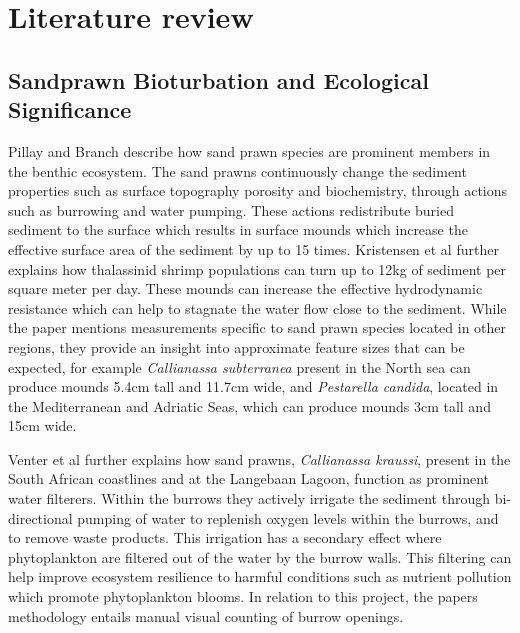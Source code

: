 %
\chapter{Literature review}
\label{ch:review}

 \section{Sandprawn Bioturbation and Ecological Significance}
 Pillay and Branch \cite{inbook} describe how sand prawn species are prominent members in the benthic ecosystem. The sand prawns continuously change the sediment properties such as surface topography porosity and biochemistry, through actions such as burrowing and water pumping. These actions redistribute buried sediment to the surface which results in surface mounds which increase the effective surface area of the sediment by up to 15 times. Kristensen et al \cite{kristensenWhatBioturbationNeed2012} further explains how thalassinid shrimp populations can turn up to 12kg of sediment per square meter per day.  These mounds can increase the effective hydrodynamic resistance which can help to stagnate the water flow close to the sediment. While the paper mentions measurements specific to sand prawn species located in other regions, they provide an insight into approximate feature sizes that can be expected, for example \textit{Callianassa subterranea} present in the North sea can produce mounds 5.4cm tall and 11.7cm wide, and \textit{Pestarella candida}, located in the Mediterranean and Adriatic Seas, which can produce mounds 3cm tall and 15cm wide.
 
 
 Venter et al \cite{venterWaterFiltrationBurrowing2020} further explains how sand prawns, \textit{Callianassa kraussi}, present in the South African coastlines and at the Langebaan Lagoon, function as prominent water filterers. Within the burrows they actively irrigate the sediment through bi-directional pumping of water to replenish oxygen levels within the burrows, and to remove waste products. This irrigation has a secondary effect where phytoplankton are filtered out of the water by the burrow walls. This filtering can help improve ecosystem resilience to harmful conditions such as nutrient pollution which promote phytoplankton blooms. In relation to this project, the papers methodology entails manual visual counting of burrow openings.
 

